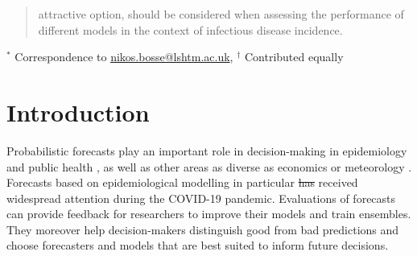 \documentclass{article}
\providecommand{\DIFaddtex}[1]{{\protect\color{blue}\uwave{#1}}} %
\providecommand{\DIFdeltex}[1]{{\protect\color{red}\sout{#1}}}                      %
\providecommand{\DIFaddbegin}{} %
\providecommand{\DIFaddend}{} %
\providecommand{\DIFdelbegin}{} %
\providecommand{\DIFdelend}{} %
\providecommand{\DIFadd}[1]{\texorpdfstring{\DIFaddtex{#1}}{#1}} %
\providecommand{\DIFdel}[1]{\texorpdfstring{\DIFdeltex{#1}}{}} %
\newcommand{\DIFscaledelfig}{0.5}
\newlength{\DIFdelgraphicswidth} %
\newlength{\DIFdelgraphicsheight} %
\newcommand{\DIFaddincludegraphics}[2][]{{\color{blue}\fbox{\DIFOincludegraphics[#1]{#2}}}} %
\newcommand{\DIFdelincludegraphics}[2][]{%
\sbox{\DIFdelgraphicsbox}{\DIFOincludegraphics[#1]{#2}}%
\settoboxwidth{\DIFdelgraphicswidth}{\DIFdelgraphicsbox} %
\settoboxtotalheight{\DIFdelgraphicsheight}{\DIFdelgraphicsbox} %
\scalebox{\DIFscaledelfig}{%
\parbox[b]{\DIFdelgraphicswidth}{\usebox{\DIFdelgraphicsbox}\\[-\baselineskip] \rule{\DIFdelgraphicswidth}{0em}}\llap{\resizebox{\DIFdelgraphicswidth}{\DIFdelgraphicsheight}{%
\setlength{\unitlength}{\DIFdelgraphicswidth}%
\begin{picture}(1,1)%
\thicklines\linethickness{2pt} %
{\color[rgb]{1,0,0}\put(0,0){\framebox(1,1){}}}%
{\color[rgb]{1,0,0}\put(0,0){\line( 1,1){1}}}%
{\color[rgb]{1,0,0}\put(0,1){\line(1,-1){1}}}%
\end{picture}%
}\hspace*{3pt}}} %
} %
\DeclareRobustCommand{\DIFaddbegin}{\DIFOaddbegin \let\includegraphics\DIFaddincludegraphics} %
\DeclareRobustCommand{\DIFaddend}{\DIFOaddend \let\includegraphics\DIFOincludegraphics} %
\DeclareRobustCommand{\DIFdelbegin}{\DIFOdelbegin \let\includegraphics\DIFdelincludegraphics} %
\DeclareRobustCommand{\DIFdelend}{\DIFOaddend \let\includegraphics\DIFOincludegraphics} %
\begin{document}
\begin{abstract}
attractive option, should be considered when assessing the performance of different models in the context of infectious disease incidence.
\end{abstract}

\bigskip

{\footnotesize $^*$ Correspondence to \url{nikos.bosse@lshtm.ac.uk}}, 
{\footnotesize $^\dagger$ Contributed equally}



\newpage


\section{Introduction}

Probabilistic forecasts \citep{heldProbabilisticForecastingInfectious2017} play an important role in decision-making in epidemiology and public health \citep{doi:10.2105/AJPH.2022.306831}, as well as other areas as diverse as economics \citep{timmermannForecastingMethodsFinance2018} or meteorology \citep{gneitingWeatherForecastingEnsemble2005}. Forecasts based on epidemiological modelling in particular \DIFdelbegin \DIFdel{has }\DIFdelend \DIFaddbegin \DIFadd{have }\DIFaddend received widespread attention during the COVID-19 pandemic. Evaluations of forecasts can provide feedback for researchers to improve their models and train ensembles. They moreover help decision-makers distinguish good from bad predictions and choose forecasters and models that are best suited to inform future decisions.
\end{document}
